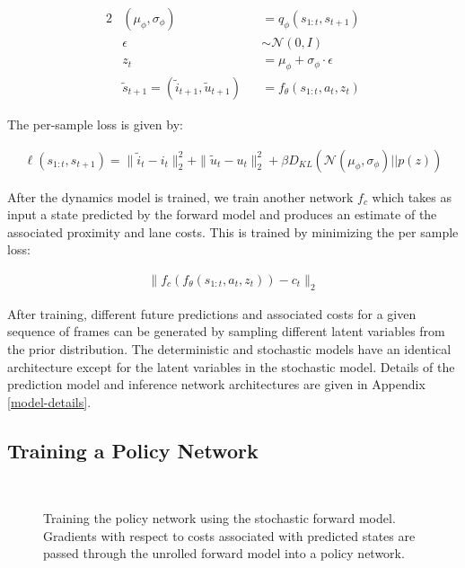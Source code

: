 \documentclass{article} %
\begin{document}
\begin{alignat}{2}
  \label{eq:update-eqn}
  &(\mu_\phi, \sigma_\phi) &&= q_\phi(s_{1:t}, s_{t+1}) \\
  &\epsilon &&\sim \mathcal{N}(0, I) \\
  &z_t &&= \mu_\phi + \sigma_\phi \cdot \epsilon \\
  &\tilde{s}_{t+1} = (\tilde{i}_{t+1}, \tilde{u}_{t+1}) &&= f_\theta(s_{1:t}, a_t, z_t)
\end{alignat}

The per-sample loss is given by:

\begin{align}
  \label{eq:update-eqn}
  \ell(s_{1:t}, s_{t+1}) = \|\tilde{i}_t - i_t \|_2^2 + \| \tilde{u}_t - u_t \|_2^2 + \beta D_{KL}(\mathcal{N}(\mu_\phi, \sigma_\phi) || p(z))
\end{align}

After the dynamics model is trained, we train another network $f_c$ which takes as input a state predicted by the forward model and produces an estimate of the associated proximity and lane costs. This is trained by minimizing the per sample loss:

\begin{align}
  \|f_c(f_\theta(s_{1:t}, a_t, z_t)) - c_t \|_2
\end{align}

After training, different future predictions and associated costs for a given sequence of frames can be generated by sampling different latent variables from the prior distribution.
The deterministic and stochastic models have an identical architecture except for the latent variables in the stochastic model.
Details of the prediction model and inference network architectures are given in Appendix \ref{model-details}.

\subsection{Training a Policy Network}


\begin{figure}[t!]
    \centering
     \\
    \label{svg}
    \caption{Training the policy network using the stochastic forward model. Gradients with respect to costs associated with predicted states are passed through the unrolled forward model into a policy network.}
\end{figure}
\end{document}
